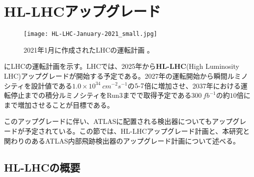 \section{HL-LHCアップグレード}
\label{sec:HL-LHC}
\begin{figure}[tbp]
  \centering
  \texttt{[image: HL-LHC-January-2021\_small.jpg]}
  \caption[LHCの運転計画]{2021年1月に作成されたLHCの運転計画 \cite{hl-lhc}。}
  \label{fig:hl-lhc}
\end{figure}

にLHCの運転計画を示す。LHCでは、2025年から\textbf{HL-LHC}(High Luminosity LHC)アップグレードが開始する予定である。2027年の運転開始から瞬間ルミノシティを設計値である$1.0\times 10^{34}\ \si{cm^{-2}s^{-1}}$の$5 \mathchar`- 7$倍に増加させ、2037年における運転停止までの積分ルミノシティをRun3までで取得予定である$300\ \si{fb^{-1}}$の約$10$倍にまで増加させることが目標である。

このアップグレードに伴い、ATLASに配置される検出器についてもアップグレードが予定されている。この節では、HL-LHCアップグレード計画と、本研究と関わりのあるATLAS内部飛跡検出器のアップグレード計画について述べる。

\subsection{HL-LHCの概要}
\label{sec:HL-LHC-gaiyou}

